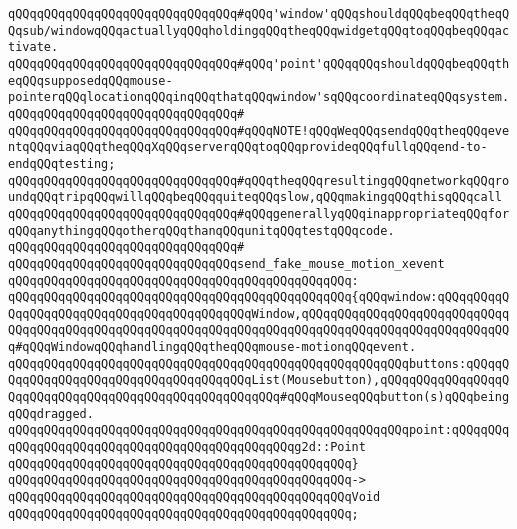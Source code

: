 \verb|qQQqqQQqqQQqqQQqqQQqqQQqqQQqqQQq#qQQq'window'qQQqshouldqQQqbeqQQqtheqQQqsub/windowqQQqactuallyqQQqholdingqQQqtheqQQqwidgetqQQqtoqQQqbeqQQqactivate.|\newline
\verb|qQQqqQQqqQQqqQQqqQQqqQQqqQQqqQQq#qQQq'point'qQQqqQQqshouldqQQqbeqQQqtheqQQqsupposedqQQqmouse-pointerqQQqlocationqQQqinqQQqthatqQQqwindow'sqQQqcoordinateqQQqsystem.|\newline
\verb|qQQqqQQqqQQqqQQqqQQqqQQqqQQqqQQq#|\newline
\verb|qQQqqQQqqQQqqQQqqQQqqQQqqQQqqQQq#qQQqNOTE!qQQqWeqQQqsendqQQqtheqQQqeventqQQqviaqQQqtheqQQqXqQQqserverqQQqtoqQQqprovideqQQqfullqQQqend-to-endqQQqtesting;|\newline
\verb|qQQqqQQqqQQqqQQqqQQqqQQqqQQqqQQq#qQQqtheqQQqresultingqQQqnetworkqQQqroundqQQqtripqQQqwillqQQqbeqQQqquiteqQQqslow,qQQqmakingqQQqthisqQQqcall|\newline
\verb|qQQqqQQqqQQqqQQqqQQqqQQqqQQqqQQq#qQQqgenerallyqQQqinappropriateqQQqforqQQqanythingqQQqotherqQQqthanqQQqunitqQQqtestqQQqcode.|\newline
\verb|qQQqqQQqqQQqqQQqqQQqqQQqqQQqqQQq#|\newline
\verb|qQQqqQQqqQQqqQQqqQQqqQQqqQQqqQQqsend_fake_mouse_motion_xevent|\newline
\verb|qQQqqQQqqQQqqQQqqQQqqQQqqQQqqQQqqQQqqQQqqQQqqQQq:|\newline
\verb|qQQqqQQqqQQqqQQqqQQqqQQqqQQqqQQqqQQqqQQqqQQqqQQq{qQQqwindow:qQQqqQQqqQQqqQQqqQQqqQQqqQQqqQQqqQQqqQQqqQQqWindow,qQQqqQQqqQQqqQQqqQQqqQQqqQQqqQQqqQQqqQQqqQQqqQQqqQQqqQQqqQQqqQQqqQQqqQQqqQQqqQQqqQQqqQQqqQQqqQQqqQQq#qQQqWindowqQQqhandlingqQQqtheqQQqmouse-motionqQQqevent.|\newline
\verb|qQQqqQQqqQQqqQQqqQQqqQQqqQQqqQQqqQQqqQQqqQQqqQQqqQQqqQQqbuttons:qQQqqQQqqQQqqQQqqQQqqQQqqQQqqQQqqQQqqQQqList(Mousebutton),qQQqqQQqqQQqqQQqqQQqqQQqqQQqqQQqqQQqqQQqqQQqqQQqqQQqqQQq#qQQqMouseqQQqbutton(s)qQQqbeingqQQqdragged.|\newline
\verb|qQQqqQQqqQQqqQQqqQQqqQQqqQQqqQQqqQQqqQQqqQQqqQQqqQQqqQQqpoint:qQQqqQQqqQQqqQQqqQQqqQQqqQQqqQQqqQQqqQQqqQQqqQQqg2d::Point|\newline
\verb|qQQqqQQqqQQqqQQqqQQqqQQqqQQqqQQqqQQqqQQqqQQqqQQq}|\newline
\verb|qQQqqQQqqQQqqQQqqQQqqQQqqQQqqQQqqQQqqQQqqQQqqQQq->|\newline
\verb|qQQqqQQqqQQqqQQqqQQqqQQqqQQqqQQqqQQqqQQqqQQqqQQqVoid|\newline
\verb|qQQqqQQqqQQqqQQqqQQqqQQqqQQqqQQqqQQqqQQqqQQqqQQq;|\newline
